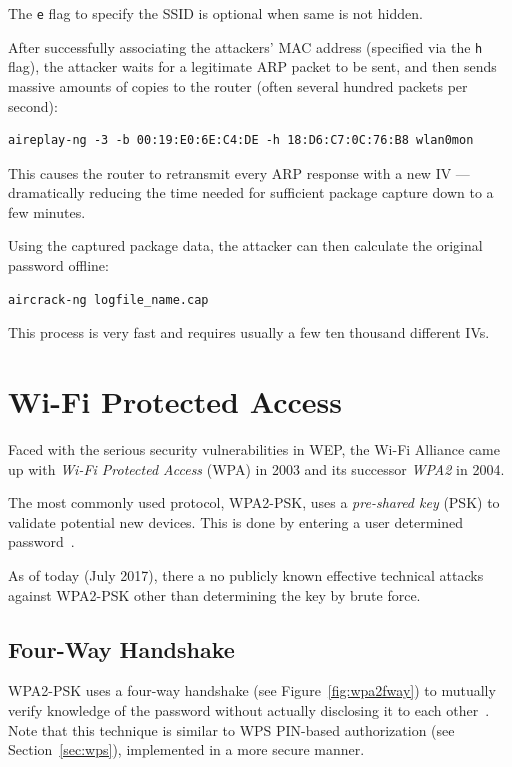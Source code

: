 The \lstinline{e} flag to specify the SSID is optional when same is not hidden.

After successfully associating the attackers' MAC address (specified via the \lstinline{h} flag), the attacker waits for a legitimate ARP packet to be sent, and then sends massive amounts of copies to the router (often several hundred packets per second):

\begin{lstlisting}
aireplay-ng -3 -b 00:19:E0:6E:C4:DE -h 18:D6:C7:0C:76:B8 wlan0mon
\end{lstlisting}

This causes the router to retransmit every ARP response with a new IV --- dramatically reducing the time needed for sufficient package capture down to a few minutes.

Using the captured package data, the attacker can then calculate the original password offline:

\begin{lstlisting}
aircrack-ng logfile_name.cap
\end{lstlisting}

This process is very fast and requires usually a few ten thousand different IVs.

\section{Wi-Fi Protected Access}

Faced with the serious security vulnerabilities in WEP, the Wi-Fi Alliance came up with \emph{Wi-Fi Protected Access} (WPA) in 2003 and its successor \emph{WPA2} in 2004.

The most commonly used protocol, WPA2-PSK, uses a \emph{pre-shared key} (PSK) to validate potential new devices. This is done by entering a user determined password~\cite{WiFi16}.

As of today (July 2017), there a no publicly known effective technical attacks against WPA2-PSK other than determining the key by brute force.

\subsection{Four-Way Handshake}\label{sec:wpa2handshake}

WPA2-PSK uses a four-way handshake (see Figure~\ref{fig:wpa2fway}) to mutually verify knowledge of the password without actually disclosing it to each other~\cite{WiFi16}. Note that this technique is similar to WPS PIN-based authorization (see Section~\ref{sec:wps}), implemented in a more secure manner.

